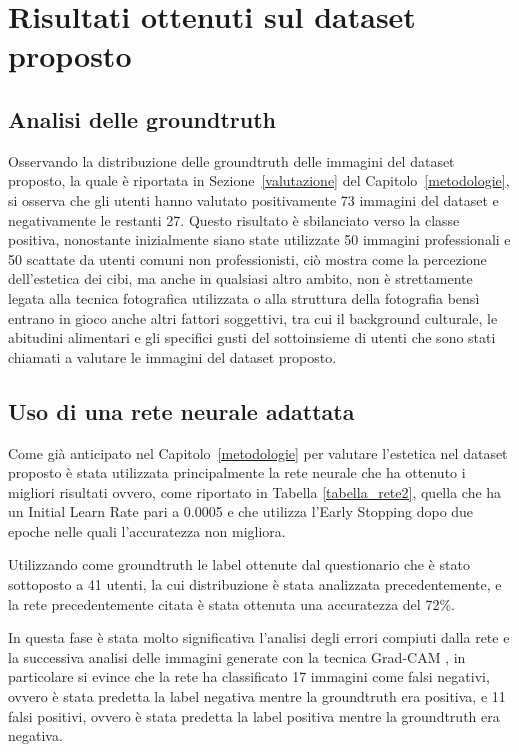 \section{Risultati ottenuti sul dataset proposto}

\subsection{Analisi delle groundtruth}

Osservando la distribuzione delle groundtruth delle immagini del dataset proposto, la quale è riportata in Sezione~\ref{valutazione} del Capitolo~\ref{metodologie}, si osserva che gli utenti hanno valutato positivamente 73 immagini del dataset e negativamente le restanti 27. Questo risultato è sbilanciato verso la classe positiva, nonostante inizialmente siano state utilizzate 50 immagini professionali e 50 scattate da utenti comuni non professionisti, ciò mostra come la percezione dell'estetica dei cibi, ma anche in qualsiasi altro ambito, non è strettamente legata alla tecnica fotografica utilizzata o alla struttura della fotografia bensì entrano in gioco anche altri fattori soggettivi, tra cui il background culturale, le abitudini alimentari e gli specifici gusti del sottoinsieme di utenti che sono stati chiamati a valutare le immagini del dataset proposto.

\subsection{Uso di una rete neurale adattata}

Come già anticipato nel Capitolo~\ref{metodologie} per valutare l'estetica nel dataset proposto è stata utilizzata principalmente la rete neurale che ha ottenuto i migliori risultati ovvero, come riportato in Tabella \ref{tabella_rete2}, quella che ha un Initial Learn Rate pari a 0.0005 e che utilizza l'Early Stopping dopo due epoche nelle quali l'accuratezza non migliora.

Utilizzando come groundtruth le label ottenute dal questionario che è stato sottoposto a 41 utenti, la cui distribuzione è stata analizzata precedentemente, e la rete precedentemente citata è stata ottenuta una accuratezza del 72\%.

In questa fase è stata molto significativa l'analisi degli errori compiuti dalla rete e la successiva analisi delle immagini generate con la tecnica Grad-CAM \cite{selvaraju2017grad}, in particolare si evince che la rete ha classificato 17 immagini come falsi negativi, ovvero è stata predetta la label negativa mentre la groundtruth era positiva, e 11 falsi positivi, ovvero è stata predetta la label positiva mentre la groundtruth era negativa. 

